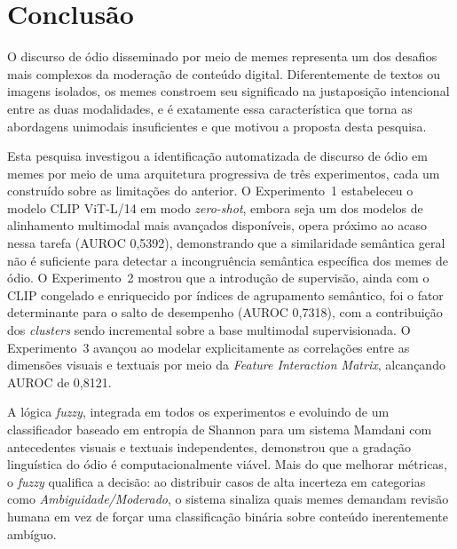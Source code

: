 \chapter{Conclusão}
\label{cap:05}

O discurso de ódio disseminado por meio de memes representa um dos desafios mais complexos da moderação de conteúdo digital. Diferentemente de textos ou imagens isolados, os memes constroem seu significado na justaposição intencional entre as duas modalidades, e é exatamente essa característica que torna as abordagens unimodais insuficientes e que motivou a proposta desta pesquisa.

Esta pesquisa investigou a identificação automatizada de discurso de ódio em memes por meio de uma arquitetura progressiva de três experimentos, cada um construído sobre as limitações do anterior. O Experimento~1 estabeleceu o modelo CLIP ViT-L/14 em modo \textit{zero-shot}, embora seja um dos modelos de alinhamento multimodal mais avançados disponíveis, opera próximo ao acaso nessa tarefa (AUROC 0,5392), demonstrando que a similaridade semântica geral não é suficiente para detectar a incongruência semântica específica dos memes de ódio. O Experimento~2 mostrou que a introdução de supervisão, ainda com o CLIP congelado e enriquecido por índices de agrupamento semântico, foi o fator determinante para o salto de desempenho (AUROC 0,7318), com a contribuição dos \textit{clusters} sendo incremental sobre a base multimodal supervisionada. O Experimento~3 avançou ao modelar explicitamente as correlações entre as dimensões visuais e textuais por meio da \textit{Feature Interaction Matrix}, alcançando AUROC de 0,8121.

A lógica \textit{fuzzy}, integrada em todos os experimentos e evoluindo de um classificador baseado em entropia de Shannon para um sistema Mamdani com antecedentes visuais e textuais independentes, demonstrou que a gradação linguística do ódio é computacionalmente viável. Mais do que melhorar métricas, o \textit{fuzzy} qualifica a decisão: ao distribuir casos de alta incerteza em categorias como \textit{Ambiguidade/Moderado}, o sistema sinaliza quais memes demandam revisão humana em vez de forçar uma classificação binária sobre conteúdo inerentemente ambíguo.

